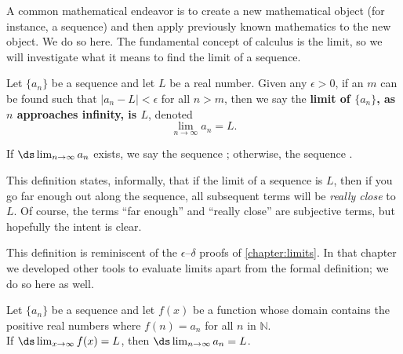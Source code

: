 A common mathematical endeavor is to create a new mathematical object (for instance, a sequence) and then apply previously known mathematics to the new object. We do so here. The fundamental concept of calculus is the limit, so we will investigate what it means to find the limit of a sequence.

{Let $\{a_n\}$ be a sequence and let $L$ be a real number. Given any $\epsilon>0$, if an $m$ can be found such that $|a_n-L|<\epsilon$ for all $n>m$, then we say the \textbf{limit of $\{a_n\}$, as $n$ approaches infinity, is $L$}, denoted $$\lim_{n\to\infty}a_n = L.$$

If $\ds\lim_{n\to\infty} a_n$ exists, we say the sequence ; otherwise, the sequence .
}

This definition states, informally, that if the limit of a sequence is $L$, then if you go far enough out along the sequence, all subsequent terms will be \emph{really close} to $L$. Of course, the terms ``far enough'' and ``really close'' are subjective terms, but hopefully the intent is clear.

This definition is reminiscent of the $\epsilon$--$\delta$ proofs of \autoref{chapter:limits}. In that chapter we developed other tools to evaluate limits apart from the formal definition; we do so here as well.

{Let $\{a_n\}$ be a sequence and let $f(x)$ be a function whose domain contains the positive real numbers where $f(n) = a_n$ for all $n$ in $\mathbb{N}$. \\

If $\ds \lim_{x\to\infty} f(x) = L$, then $\ds\lim_{n\to\infty} a_n = L$.
}


